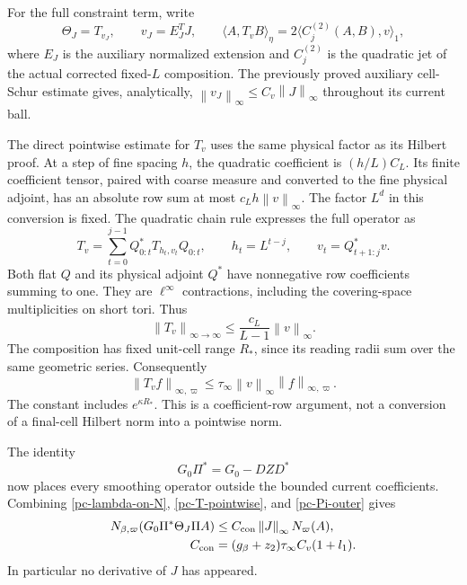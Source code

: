 \documentclass[11pt]{article}
\newcommand{\norm}[1]{\left\lVert#1\right\rVert}
\begin{document}
For the full constraint term, write
\begin{equation}\label{pc-constraint-weight}
 \Theta_J=T_{v_J},\qquad v_J=E_J^T J,
 \qquad
 \langle A,T_vB\rangle_\eta
      =2\langle C_j^{(2)}(A,B),v\rangle_1,
\end{equation}
where $E_J$ is the auxiliary normalized extension and $C_j^{(2)}$
is the quadratic jet of the actual corrected fixed-$L$ composition.
The previously proved auxiliary cell-Schur estimate gives, analytically,
$\norm{v_J}_\infty\le C_v\norm{J}_\infty$ throughout its current ball.

The direct pointwise estimate for $T_v$ uses the same physical
factor as its Hilbert proof. At a step of fine spacing $h$, the
quadratic coefficient is $(h/L)C_L$. Its finite coefficient tensor,
paired with coarse measure and converted to the fine physical
adjoint, has an absolute row sum at most $c_Lh\norm{v}_\infty$.
The factor $L^d$ in this conversion is fixed. The quadratic chain
rule expresses the full operator as
\begin{equation}\label{pc-pointwise-chain}
 T_v=\sum_{t=0}^{j-1}Q_{0:t}^*T_{h_t,v_t}Q_{0:t},\qquad
 h_t=L^{t-j},\qquad v_t=Q_{t+1:j}^*v.
\end{equation}
Both flat $Q$ and its physical adjoint $Q^*$ have nonnegative row
coefficients summing to one. They are $\ell^\infty$ contractions,
including the covering-space multiplicities on short tori. Thus
\[
 \norm{T_v}_{\infty\to\infty}
       \le\frac{c_L}{L-1}\norm{v}_\infty.
\]
The composition has fixed unit-cell range $R_*$, since its reading
radii sum over the same geometric series. Consequently
\begin{equation}\label{pc-T-pointwise}
 \norm{T_vf}_{\infty,\varpi}
       \le\tau_\infty\norm{v}_\infty
                         \norm{f}_{\infty,\varpi}.
\end{equation}
The constant includes $e^{\kappa R_*}$. This is a coefficient-row
argument, not a conversion of a final-cell Hilbert norm into a
pointwise norm.

The identity
\begin{equation}\label{pc-Pi-outer}
 G_0\Pi^*=G_0-DZD^*
\end{equation}
now places every smoothing operator outside the bounded current
coefficients. Combining \eqref{pc-lambda-on-N},
\eqref{pc-T-pointwise}, and \eqref{pc-Pi-outer} gives
\begin{align}
 N_{\beta,\varpi}(G_0\Pi^*\Theta_J\Pi A)
       &\le C_{\rm con}\norm{J}_\infty N_\varpi(A),
       \label{pc-constraint-N-bound}\\
 C_{\rm con}&=(g_\beta+z_2)\tau_\infty C_v(1+l_1).
       \notag
\end{align}
In particular no derivative of $J$ has appeared.
\end{document}
